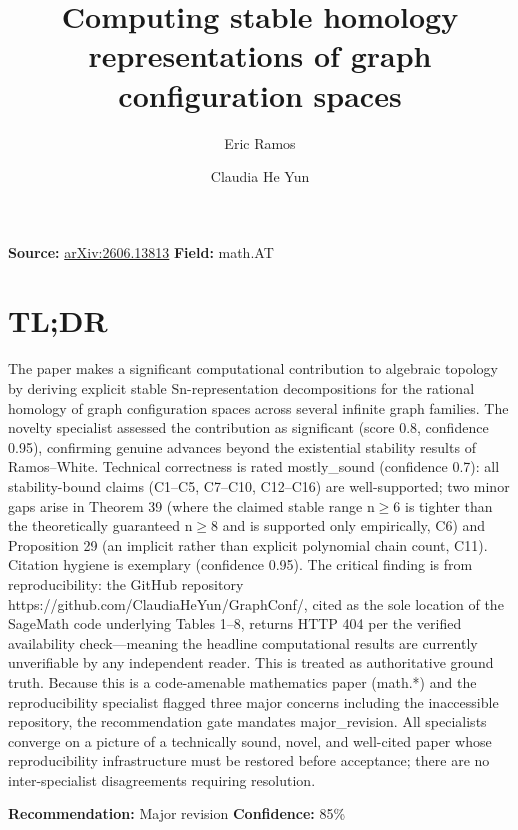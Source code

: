 \documentclass[11pt]{article}
\title{Computing stable homology representations of graph configuration spaces}
\author{Eric Ramos \and Claudia He Yun}
\date{}
\begin{document}
\maketitle

\noindent\textbf{Source:} \href{https://arxiv.org/abs/2606.13813}{arXiv:2606.13813} \quad \textbf{Field:} math.AT\\

\section*{TL;DR}
The paper makes a significant computational contribution to algebraic topology by deriving explicit stable Sn-representation decompositions for the rational homology of graph configuration spaces across several infinite graph families. The novelty specialist assessed the contribution as significant (score 0.8, confidence 0.95), confirming genuine advances beyond the existential stability results of Ramos--White. Technical correctness is rated mostly\_sound (confidence 0.7): all stability-bound claims (C1--C5, C7--C10, C12--C16) are well-supported; two minor gaps arise in Theorem 39 (where the claimed stable range n\ensuremath{\ge}6 is tighter than the theoretically guaranteed n\ensuremath{\ge}8 and is supported only empirically, C6) and Proposition 29 (an implicit rather than explicit polynomial chain count, C11). Citation hygiene is exemplary (confidence 0.95). The critical finding is from reproducibility: the GitHub repository https://github.com/ClaudiaHeYun/GraphConf/, cited as the sole location of the SageMath code underlying Tables 1--8, returns HTTP 404 per the verified availability check---meaning the headline computational results are currently unverifiable by any independent reader. This is treated as authoritative ground truth. Because this is a code-amenable mathematics paper (math.*) and the reproducibility specialist flagged three major concerns including the inaccessible repository, the recommendation gate mandates major\_revision. All specialists converge on a picture of a technically sound, novel, and well-cited paper whose reproducibility infrastructure must be restored before acceptance; there are no inter-specialist disagreements requiring resolution.

\textbf{Recommendation:} Major revision \quad \textbf{Confidence:} 85\%\\
\end{document}
